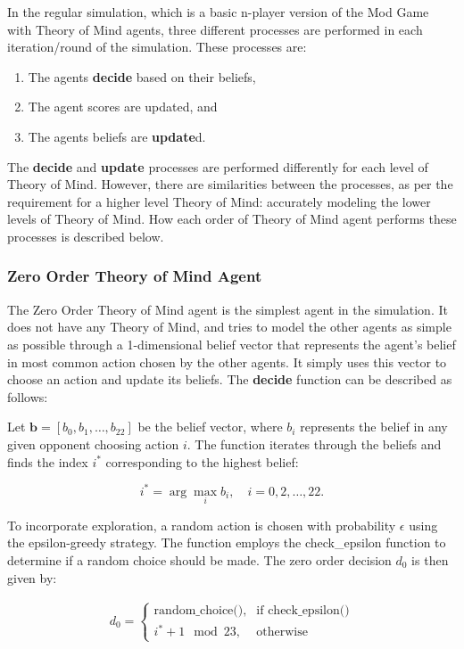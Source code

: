 In the regular simulation, which is a basic n-player version of the Mod Game with Theory of Mind agents, three different processes are performed in each iteration/round of the simulation. These processes are:
\begin{enumerate}
    \item The agents \textbf{decide} based on their beliefs,
    \item The agent scores are updated, and
    \item The agents beliefs are \textbf{update}d.
\end{enumerate}

The \textbf{decide} and \textbf{update} processes are performed differently for each level of Theory of Mind. However, there are similarities between the processes, as per the requirement for a higher level Theory of Mind: accurately modeling the lower levels of Theory of Mind. How each order of Theory of Mind agent performs these processes is described below.

\subsubsection{Zero Order Theory of Mind Agent}

The Zero Order Theory of Mind agent is the simplest agent in the simulation. It does not have any Theory of Mind, and tries to model the other agents as simple as possible through a 1-dimensional belief vector that represents the agent's belief in most common action chosen by the other agents. It simply uses this vector to choose an action and update its beliefs. The \textbf{decide} function can be described as follows:

Let $\mathbf{b} = [b_0, b_1, \ldots, b_{22}]$ be the belief vector, where $b_i$ represents the belief in any given opponent choosing action $i$. The function iterates through the beliefs and finds the index $i^*$ corresponding to the highest belief:

\[
i^* = \arg\max_i b_i, \quad i = 0, 2, \ldots, 22.
\]

To incorporate exploration, a random action is chosen with probability $\epsilon$ using the epsilon-greedy strategy. The function employs the check\_epsilon function to determine if a random choice should be made. The zero order decision $d_0$ is then given by:

\label{eq:zero-order-decide}
\[
\begin{aligned}
d_0 =
\begin{cases}
\text{{random\_choice()}}, & \text{{if }} \text{{check\_epsilon()}} \\
i^* + 1 \mod 23, & \text{{otherwise}}
\end{cases}
\end{aligned}
\]

